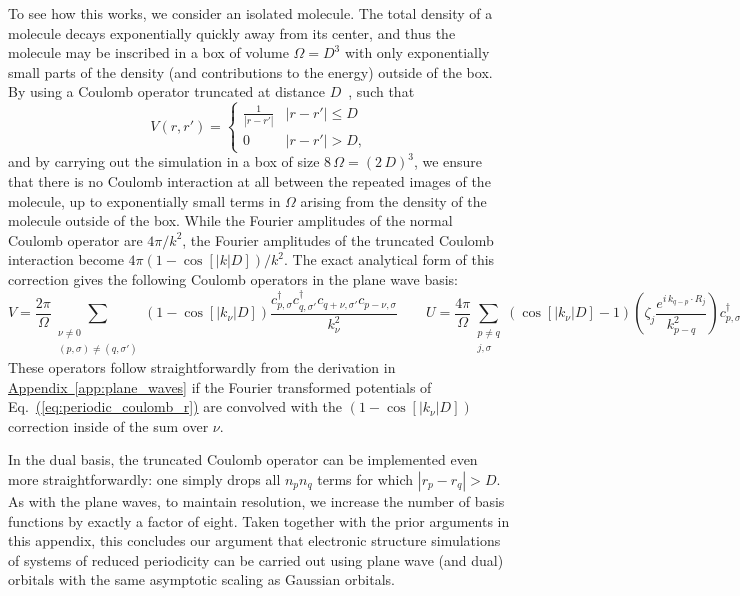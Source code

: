 \documentclass[superscriptaddress,aps,pra,nofootinbib,notitlepage,10pt,longbibliography]{revtex4-1}
\newcommand{\eq}[1]{Eq.~\hyperref[eq:#1]{(\ref*{eq:#1})}}
\DeclareRobustCommand{\app}[1]{\hyperref[app:#1]{Appendix~\ref*{app:#1}}}
\begin{document}
To see how this works, we consider  an isolated molecule. The total density
of a molecule decays exponentially quickly away from its center, and thus the molecule may be inscribed in a box of volume $\Omega = D^3$ with only exponentially small parts of the density (and contributions to the energy) outside of the box. By using a Coulomb operator truncated at distance $D$~\cite{fusti2002accurate}, such that
\begin{equation}
V\left(r, r'\right) = \begin{cases} \frac{1}{\left | r - r' \right |} & \left | r - r' \right | \leq D \\
0  & \left | r - r' \right | > D,
\end{cases}
\end{equation}
and by carrying out the simulation in a box of size $8\, \Omega = (2\,D)^3$, we ensure that there is no Coulomb interaction at all between the repeated images of the molecule, up to exponentially small terms in $\Omega$ arising from the density of the molecule outside of the box. While the Fourier amplitudes of the normal Coulomb operator are $4 \pi / k^2$, the Fourier amplitudes of the truncated Coulomb interaction become $4 \pi (1 - \cos[|k|D]) / k^2$. The exact analytical form of this correction gives the following Coulomb operators in the plane wave basis:
\begin{equation}
V = \frac{2 \pi}{\Omega} \!\!\!\!\!\!\!\!  \sum_{\substack{\nu \neq 0\\ (p, \sigma) \neq (q, \sigma')}} \!\!\!\!\!\!\!\! \left(1 - \cos\left[\left | k_\nu \right| D\right] \right)\frac{c^\dagger_{p,\sigma} c_{q,\sigma'}^\dagger c_{q + \nu,\sigma'} c_{p - \nu,\sigma}}{k_\nu^2}%
\qquad
U = \frac{4 \pi}{\Omega} \sum_{\substack{p \neq q \\ j,\sigma}} \left(\cos\left[\left | k_\nu \right| D\right] - 1\right) \left(\zeta_j \frac{e^{i \, k_{q-p} \cdot R_j}}{k_{p-q}^2}\right) c^\dagger_{p, \sigma} c_{q, \sigma}.
\end{equation}
These operators follow straightforwardly from the derivation in \app{plane_waves} if the Fourier transformed potentials of \eq{periodic_coulomb_r} are convolved with the $(1 - \cos[|k_\nu|D])$ correction inside of the sum over $\nu$.

In the dual basis, the truncated Coulomb operator can be implemented even more straightforwardly: one simply drops all $n_p n_q$ terms for which $|r_p - r_q| > D$. As with the plane waves, to maintain resolution, we increase the number of basis functions by exactly a factor of eight. Taken together with the prior arguments in this appendix, this concludes our argument that electronic structure simulations of systems of reduced periodicity can be carried out using plane wave (and dual) orbitals with the same asymptotic scaling as Gaussian orbitals.
\end{document}

